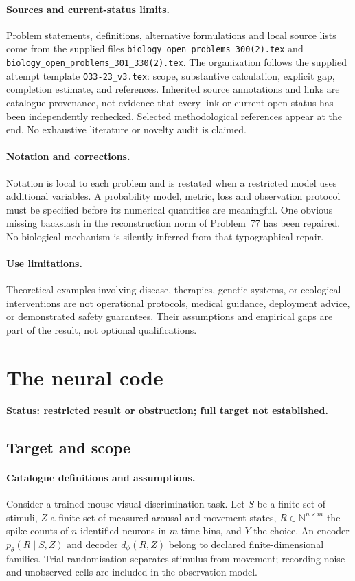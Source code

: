 \documentclass[11pt]{article}
\begin{document}
\paragraph{Sources and current-status limits.}
Problem statements, definitions, alternative formulations and local source lists
come from the supplied files
\texttt{biology\_open\_problems\_300(2).tex} and
\texttt{biology\_open\_problems\_301\_330(2).tex}.
The organization follows the supplied attempt template
\texttt{O33-23\_v3.tex}: scope, substantive calculation, explicit gap,
completion estimate, and references. Inherited source annotations and links are
catalogue provenance, not evidence that every link or current open status has
been independently rechecked. Selected methodological references appear at the
end. No exhaustive literature or novelty audit is claimed.

\paragraph{Notation and corrections.}
Notation is local to each problem and is restated when a restricted model uses
additional variables. A probability model, metric, loss and observation protocol
must be specified before its numerical quantities are meaningful. One obvious
missing backslash in the reconstruction norm of Problem~77 has been repaired.
No biological mechanism is silently inferred from that typographical repair.

\paragraph{Use limitations.}
Theoretical examples involving disease, therapies, genetic systems, or ecological
interventions are not operational protocols, medical guidance, deployment advice,
or demonstrated safety guarantees. Their assumptions and empirical gaps are part
of the result, not optional qualifications.


\section*{The neural code}
\label{prob:101}
\noindent\textbf{Status: restricted result or obstruction; full target not established.}
\subsection{Target and scope}
\paragraph{Catalogue definitions and assumptions.}
Consider a trained mouse visual discrimination task. Let $S$ be a finite set of stimuli, $Z$ a finite set of measured arousal and movement states, $R\in\mathbb{N}^{n\times m}$ the spike counts of $n$ identified neurons in $m$ time bins, and $Y$ the choice. An encoder $p_\theta(R\mid S,Z)$ and decoder $d_\phi(R,Z)$ belong to declared finite-dimensional families. Trial randomisation separates stimulus from movement; recording noise and unobserved cells are included in the observation model.
\end{document}
